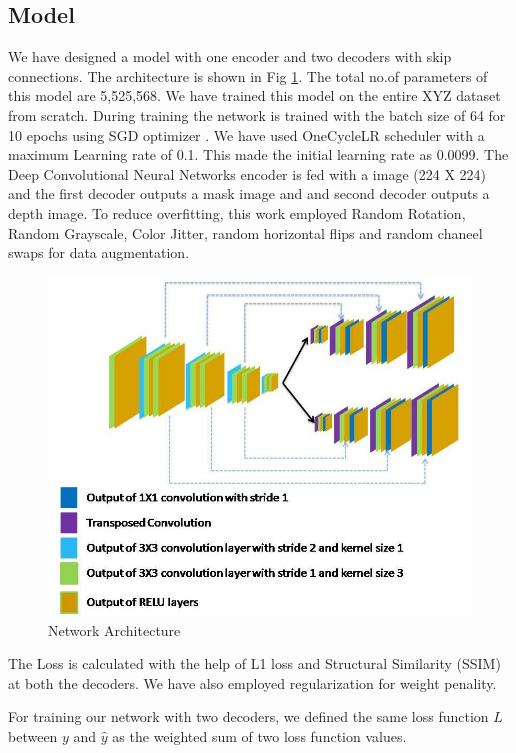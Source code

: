 \documentclass{article}
\begin{document}
\subsection{Model}
We have designed a model with one encoder and two decoders with skip connections. The architecture is shown in Fig \ref{fig:modelarch}. The total no.of parameters of this model are 5,525,568. We have trained this model on the entire XYZ dataset from scratch. During training the network is trained with the batch size of 64 for 10 epochs using SGD optimizer \cite{bottou2010large}. We have used OneCycleLR scheduler \cite{smith2018disciplined} with a maximum Learning rate of 0.1. This made the initial learning rate as 0.0099. The Deep Convolutional Neural Networks encoder is fed with a image (224 X 224) and the first decoder outputs a mask image and and second decoder outputs a depth image. To reduce overfitting\cite{perez2017effectiveness}, this work employed Random Rotation, Random Grayscale, Color Jitter, random horizontal flips and random chaneel swaps for data augmentation.

\begin{figure}[h!]
\centering
  \includegraphics[width=1\textwidth]{networkarchitecture.jpg}
  \caption{Network Architecture}
  \label{fig:modelarch}
\end{figure}

The Loss is calculated with the help of L1 loss and Structural Similarity (SSIM) at both the decoders. We have also employed regularization for weight penality.

For training our network with two decoders, we defined the same loss function $L$ between $y$ and $\hat{y}$ as the weighted sum of two loss function values.
\end{document}
